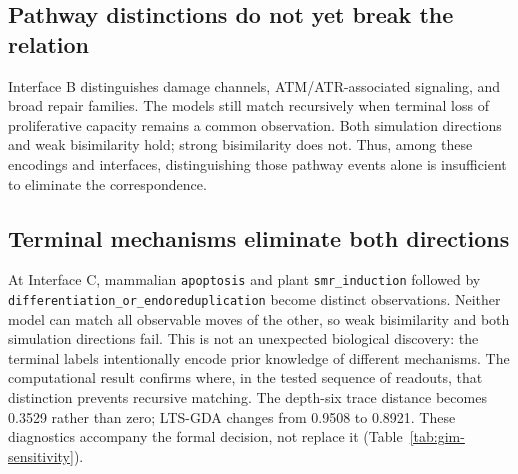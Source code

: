 \documentclass{ws-jbcb}
\numberwithin{equation}{section}
\begin{document}
\subsection{Pathway distinctions do not yet break the relation}
Interface B distinguishes damage channels, ATM/ATR-associated signaling, and
broad repair families. The models still match recursively when terminal
loss of proliferative capacity remains a common observation. Both simulation
directions and weak bisimilarity hold; strong bisimilarity does not.
Thus, among these encodings and interfaces, distinguishing those pathway
events alone is insufficient to eliminate the correspondence.

\subsection{Terminal mechanisms eliminate both directions}
At Interface C, mammalian \texttt{apoptosis} and plant
\texttt{smr\_induction} followed by
\texttt{differentiation\_or\_endoreduplication} become distinct observations.
Neither model can match all observable moves of the other, so weak
bisimilarity and both simulation directions fail. This is not an unexpected
biological discovery: the terminal labels intentionally encode prior knowledge
of different mechanisms. The computational result confirms where, in the
tested sequence of readouts, that distinction prevents recursive matching.
The depth-six trace distance becomes 0.3529 rather than zero; LTS-GDA changes
from 0.9508 to 0.8921. These diagnostics accompany the formal decision, not
replace it (Table~\ref{tab:gim-sensitivity}).

\begin{table}[t]
\end{table}
\end{document}
